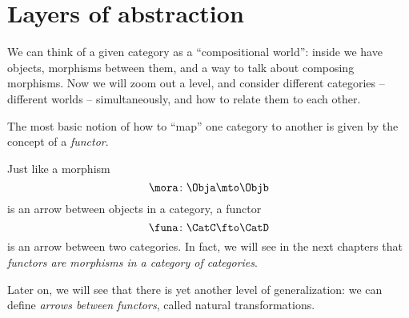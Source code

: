 
\section{Layers of abstraction}
\label{sec:functors}


We can think of a given category \CatC as a ``compositional world'': inside \CatC we have objects, morphisms between them, and a way to talk about composing morphisms.
Now we will zoom out a level, and consider different categories -- different worlds -- simultaneously, and how to relate them to each other.

The most basic notion of how to ``map'' one category to another is given by the concept of a \emph{functor}.

Just like a morphism
% 
\begin{equation}
    \mora \colon \Obja \mto \Objb
\end{equation}
% 
is an arrow between objects in a category, a functor
% 
\begin{equation}
    \funa \colon \CatC \fto \CatD
\end{equation}
% 
is an arrow between two categories.
In fact, we will see in the next chapters that \emph{functors are morphisms in a category of categories}.

Later on, we will see that there is yet another level of generalization: we can define \emph{arrows between functors}, called natural transformations.

